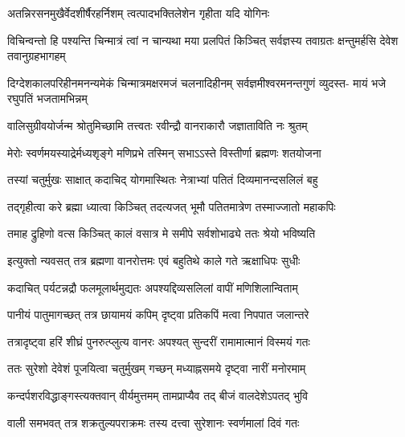 \twolineshloka
{अतन्निरसनमुखैर्वेदशीर्षैरहर्निशम्}
{त्वत्पादभक्तिलेशेन गृहीता यदि योगिनः} %

\threelineshloka
{विचिन्वन्तो हि पश्यन्ति चिन्मात्रं त्वां न चान्यथा}
{मया प्रलपितं किञ्चित् सर्वज्ञस्य तवाग्रतः}
{क्षन्तुमर्हसि देवेश तवानुग्रहभागहम्} %

\fourlineindentedshloka
{दिग्देशकालपरिहीनमनन्यमेकं}
{चिन्मात्रमक्षरमजं चलनादिहीनम्}
{सर्वज्ञमीश्वरमनन्तगुणं व्युदस्त-}
{मायं भजे रघुपतिं भजतामभिन्नम्} %






\twolineshloka
{वालिसुग्रीवयोर्जन्म श्रोतुमिच्छामि तत्त्वतः}
{रवीन्द्रौ वानराकारौ जज्ञाताविति नः श्रुतम्} %


\twolineshloka
{मेरोः स्वर्णमयस्याद्रेर्मध्यशृङ्गे मणिप्रभे}
{तस्मिन् सभाऽऽस्ते विस्तीर्णा ब्रह्मणः शतयोजना} %

\twolineshloka
{तस्यां चतुर्मुखः साक्षात् कदाचिद् योगमास्थितः}
{नेत्राभ्यां पतितं दिव्यमानन्दसलिलं बहु} %

\twolineshloka
{तद्गृहीत्वा करे ब्रह्मा ध्यात्वा किञ्चित् तदत्यजत्}
{भूमौ पतितमात्रेण तस्माज्जातो महाकपिः} %

\twolineshloka
{तमाह द्रुहिणो वत्स किञ्चित् कालं वसात्र मे}
{समीपे सर्वशोभाढ्ये ततः श्रेयो भविष्यति} %

\twolineshloka
{इत्युक्तो न्यवसत् तत्र ब्रह्मणा वानरोत्तमः}
{एवं बहुतिथे काले गते ऋक्षाधिपः सुधीः} %

\twolineshloka
{कदाचित् पर्यटन्नद्रौ फलमूलार्थमुद्यतः}
{अपश्यद्दिव्यसलिलां वापीं मणिशिलान्विताम्} %

\twolineshloka
{पानीयं पातुमागच्छत् तत्र छायामयं कपिम्}
{दृष्ट्वा प्रतिकपिं मत्वा निपपात जलान्तरे} %

\twolineshloka
{तत्रादृष्ट्वा हरिं शीघ्रं पुनरुत्प्लुत्य वानरः}
{अपश्यत् सुन्दरीं रामामात्मानं विस्मयं गतः} %

\twolineshloka
{ततः सुरेशो देवेशं पूजयित्वा चतुर्मुखम्}
{गच्छन् मध्याह्नसमये दृष्ट्वा नारीं मनोरमाम्} %

\twolineshloka
{कन्दर्पशरविद्धाङ्गस्त्यक्तवान् वीर्यमुत्तमम्}
{तामप्राप्यैव तद् बीजं वालदेशेऽपतद् भुवि} %

\twolineshloka
{वाली समभवत् तत्र शक्रतुल्यपराक्रमः}
{तस्य दत्त्वा सुरेशानः स्वर्णमालां दिवं गतः} %


